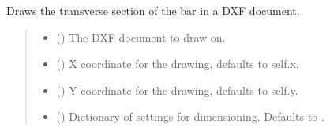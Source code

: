 \documentclass[a4paper,10pt,english]{sphinxmanual}
\begin{document}
\begin{fulllineitems}
\begin{fulllineitems}
\label{\detokenize{API:etacad.bar.Bar.draw_transverse}}
\pysigstartsignatures
{}
\pysigstopsignatures
\sphinxAtStartPar
Draws the transverse section of the bar in a DXF document.
\begin{quote}\begin{description}
\begin{itemize}
\item {} 
\sphinxAtStartPar
{} () \textendash{} The DXF document to draw on.

\item {} 
\sphinxAtStartPar
{} (\sphinxstyleliteralemphasis{\sphinxupquote{, }}) \textendash{} X coordinate for the drawing, defaults to self.x.

\item {} 
\sphinxAtStartPar
{} (\sphinxstyleliteralemphasis{\sphinxupquote{, }}) \textendash{} Y coordinate for the drawing, defaults to self.y.

\item {} 
\sphinxAtStartPar
{} (\sphinxstyleliteralemphasis{\sphinxupquote{, }}) \textendash{} Dictionary of settings for dimensioning. Defaults to .


\end{itemize}
\end{description}
\end{quote}
\end{fulllineitems}
\end{fulllineitems}
\end{document}
